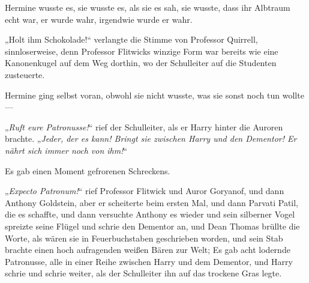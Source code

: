 Hermine wusste es, sie wusste es, als sie es sah, sie wusste, dass ihr Albtraum echt war, er wurde wahr, irgendwie wurde er wahr.

„Holt ihm Schokolade!“ verlangte die Stimme von Professor Quirrell, sinnloserweise, denn Professor Flitwicks winzige Form war bereits wie eine Kanonenkugel auf dem Weg dorthin, wo der Schulleiter auf die Studenten zusteuerte.

Hermine ging selbst voran, obwohl sie nicht wusste, was sie sonst noch tun wollte—

„\emph{Ruft eure Patronusse!}“ rief der Schulleiter, als er Harry hinter die Auroren brachte. „\emph{Jeder, der es kann! Bringt sie zwischen Harry und den Dementor! Er nährt sich immer noch von ihm!}“

Es gab einen Moment gefrorenen Schreckens.

„\emph{Expecto Patronum!}“ rief Professor Flitwick und Auror Goryanof, und dann Anthony Goldstein, aber er scheiterte beim ersten Mal, und dann Parvati Patil, die es schaffte, und dann versuchte Anthony es wieder und sein silberner Vogel spreizte seine Flügel und schrie den Dementor an, und Dean Thomas brüllte die Worte, als wären sie in Feuerbuchstaben geschrieben worden, und sein Stab brachte einen hoch aufragenden weißen Bären zur Welt; Es gab acht lodernde Patronusse, alle in einer Reihe zwischen Harry und dem Dementor, und Harry schrie und schrie weiter, als der Schulleiter ihn auf das trockene Gras legte.

